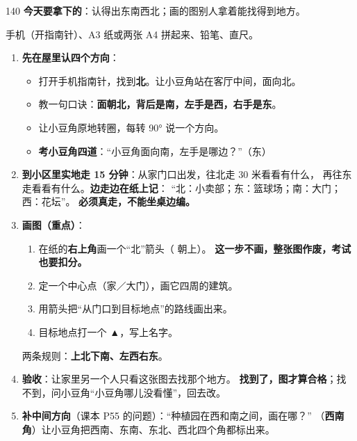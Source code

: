 \begin{lesson}{1}{40}
\textbf{今天要拿下的}：认得出东南西北；画的图别人拿着能找得到地方。

\begin{materials}
手机（开指南针）、A3 纸或两张 A4 拼起来、铅笔、直尺。
\end{materials}

\begin{enumerate}
  \item \textbf{先在屋里认四个方向}：
        \begin{itemize}
          \item 打开手机指南针，找到\textbf{北}。让小豆角站在客厅中间，面向北。
          \item 教一句口诀：\textbf{面朝北，背后是南，左手是西，右手是东}。
          \item 让小豆角原地转圈，每转 90° 说一个方向。
          \item \textbf{考小豆角四道}：“小豆角面向南，左手是哪边？”（东）
        \end{itemize}
  \item \textbf{到小区里实地走 15 分钟}：从家门口出发，往北走 30 米看看有什么，
        再往东走看看有什么。\textbf{边走边在纸上记}：
        “北：小卖部；东：篮球场；南：大门；西：花坛”。
        \textbf{必须真走，不能坐桌边编。}
  \item \textbf{画图（重点）}：
        \begin{enumerate}[label=第\arabic*步：]
          \item 在纸的\textbf{右上角}画一个“北”箭头（ 朝上）。
                \textbf{这一步不画，整张图作废，考试也要扣分。}
          \item 定一个中心点（家／大门），画它四周的建筑。
          \item 用箭头把“从门口到目标地点”的路线画出来。
          \item 目标地点打一个 \textbf{▲}，写上名字。
        \end{enumerate}
        两条规则：\textbf{上北下南、左西右东}。
  \item \textbf{验收}：让家里另一个人只看这张图去找那个地方。
        \textbf{找到了，图才算合格}；找不到，问小豆角“小豆角哪儿没看懂”，回去改。
  \item \textbf{补中间方向}（课本 P55 的问题）：“种植园在西和南之间，画在哪？”
        （\textbf{西南角}）让小豆角把西南、东南、东北、西北四个角都标出来。
\end{enumerate}


\end{lesson}
